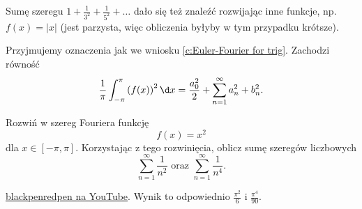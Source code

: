 Sumę szeregu $1 + \frac{1}{3^2} + \frac{1}{5^2} + \ldots$ dało się też znaleźć rozwijając inne funkcje, np. $f(x) = |x|$ (jest parzysta, więc obliczenia byłyby w tym przypadku krótsze).

\begin{corollary}
    Przyjmujemy oznaczenia jak we wniosku \ref{c:Euler-Fourier for trig}. Zachodzi równość
    \[ \frac{1}{\pi}\int_{-\pi}^\pi \left(f(x)\right)^2 \d x = \frac{a_0^2}{2} + \sum_{n=1}^\infty a_n^2 + b_n^2. \]
\end{corollary}

\begin{example}
    Rozwiń w szereg Fouriera funkcję
    \[ f(x) = x^2 \]
    dla $x \in [-\pi, \pi]$. Korzystając z tego rozwinięcia, oblicz sumę szeregów liczbowych
    \[ \sum_{n=1}^\infty \frac{1}{n^2} \text{ oraz } \sum_{n=1}^\infty \frac{1}{n^4}. \]
\end{example}
\begin{solution}
    \href{https://www.youtube.com/watch?v=2VYBGF_MPIU}{blackpenredpen na YouTube}. Wynik to odpowiednio $\frac{\pi^2}{6}$ i $\frac{\pi^4}{90}$.
\end{solution}
